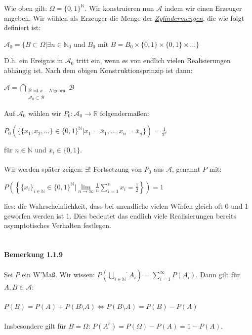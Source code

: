 \documentclass[10pt,a4paper]{report}
\numberwithin{equation}{section}
\numberwithin{figure}{section}
\theoremstyle{plain}
\theoremstyle{definition}
\theoremstyle{plain}
\theoremstyle{definition}
\theoremstyle{remark}
\theoremstyle{plain}
\begin{document}
Wie oben gilt: $\Omega=\{0,1\}^\mathbb{N}$. Wir konstruieren nun $\mathcal{A}$ indem wir einen Erzeuger angeben. Wir wählen als Erzeuger die Menge der \textit{\underline{Zylindermengen}}, die wie folgt definiert ist:
\begin{center}
$\mathcal{A}_0=\{B\subset \Omega|\exists n \in \mathbb{N}_0 \text{ und } B_0 \text{ mit } B=B_0\times\{0,1\}\times \{0,1\}\times\dots \} $
\end{center}
D.h. ein Ereignis in $\mathcal{A}_0$ tritt ein, wenn es von endlich vielen Realisierungen abhängig ist. Nach dem obigen Konstruktionsprinzip ist dann:
\begin{center}
$\mathcal{A}=\bigcap\limits_{\substack{\mathcal{B} \text{ ist }  \sigma-\text{Algebra}\\ \mathcal{A}_0\subset \mathcal{B}}}\mathcal{B}$
\end{center}       
Auf $\mathcal{A}_0$ wählen wir $P_0: \mathcal{A}_0 \to \mathbb{R}$ folgendermaßen:
\begin{center}
$P_0(\{\{x_1,x_2,\dots\}\in \{0,1\}^\mathbb{N}|x_1=\overline{x}_1,\dots,x_n=\overline{x}_n\})=\frac{1}{2^n}$
\end{center}
für $n \in \mathbb{N}$ und $\overline{x}_i \in \{0,1\}$.\\\\
Wir werden später zeigen: $\exists !$ Fortsetzung von $P_0$ aus $\mathcal{A}$, genannt $P$ mit:\begin{center}
$P\left(\left\{\{x_i\}_{i \in \mathbb{N}} \in \{0,1\}^\mathbb{N}| \lim\limits_{n \to \infty} \frac{1}{n}\sum\limits_{i=1}^n x_i=\frac{1}{2}\right\}\right)=1$
\end{center}
lies: die Wahrscheinlichkeit, dass bei unendliche vielen Würfen gleich oft 0 und 1 geworfen werden ist 1. Dies bedeutet das endlich viele Realisierungen bereits asymptotisches Verhalten festlegen.\\\\\\
\textbf{Bemerkung 1.1.9}\\\\
Sei $P$ ein W'Maß. Wir wissen: $P\left(\stackrel{\cdot}{\bigcup\limits_{i \in \mathbb{N}}}A_i\right)=\sum\limits_{i=1}^\infty P(A_i)$. Dann gilt für $A,B \in \mathcal{A}$:\\\\
$P(B)=P(A)+P(B\setminus A) \Leftrightarrow P(B\setminus A)=P(B)-P(A)$\\\\
Insbesondere gilt für $B=\Omega$: $P(A^c)=P(\Omega)-P(A)=1-P(A)$.\\\\
\end{document}
